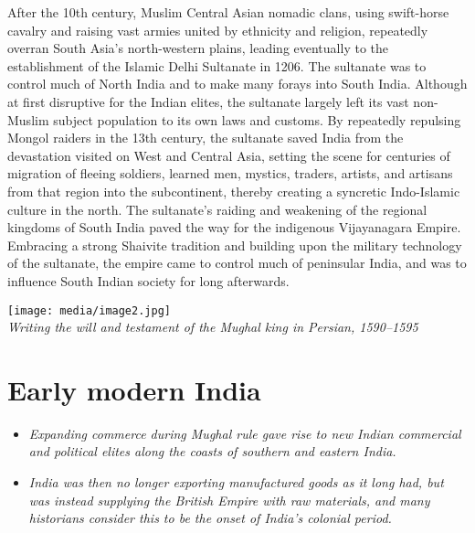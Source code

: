 After the 10th century, Muslim Central Asian nomadic clans, using
swift-horse cavalry and raising vast armies united by ethnicity and
religion, repeatedly overran South Asia's north-western plains, leading
eventually to the establishment of the Islamic Delhi Sultanate in 1206.
The sultanate was to control much of North India and to make many forays
into South India. Although at first disruptive for the Indian elites,
the sultanate largely left its vast non-Muslim subject population to its
own laws and customs. By repeatedly repulsing Mongol raiders in the 13th
century, the sultanate saved India from the devastation visited on West
and Central Asia, setting the scene for centuries of migration of
fleeing soldiers, learned men, mystics, traders, artists, and artisans
from that region into the subcontinent, thereby creating a syncretic
Indo-Islamic culture in the north. The sultanate's raiding and weakening
of the regional kingdoms of South India paved the way for the indigenous
Vijayanagara Empire. Embracing a strong Shaivite tradition and building
upon the military technology of the sultanate, the empire came to
control much of peninsular India, and was to influence South Indian
society for long afterwards.

\texttt{[image: media/image2.jpg]}\\
\emph{Writing the will and testament of the Mughal king in Persian,
1590--1595}

\section{Early modern India}\label{early-modern-india}

\begin{itemize}
\item
  \emph{Expanding commerce during Mughal rule gave rise to new Indian
  commercial and political elites along the coasts of southern and
  eastern India.}
\item
  \emph{India was then no longer exporting manufactured goods as it long
  had, but was instead supplying the British Empire with raw materials,
  and many historians consider this to be the onset of India's colonial
  period.}
\end{itemize}

